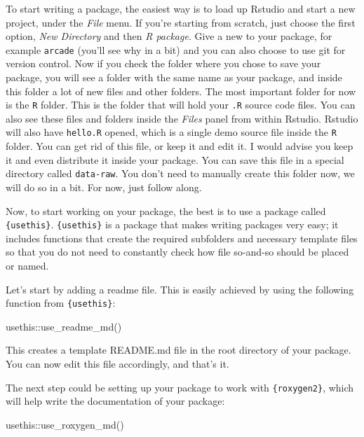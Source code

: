 \documentclass[
]{article}
\newenvironment{Shaded}{\begin{snugshade}}{\end{snugshade}}
\newcommand{\FunctionTok}[1]{\textcolor[rgb]{0.00,0.00,0.00}{#1}}
\newcommand{\NormalTok}[1]{#1}
\newcommand{\SpecialCharTok}[1]{\textcolor[rgb]{0.00,0.00,0.00}{#1}}
\begin{document}
To start writing a package, the easiest way is to load up Rstudio and start a new project, under the
\emph{File} menu. If you're starting from scratch, just choose the first option, \emph{New Directory} and then
\emph{R package}. Give a new to your package, for example \texttt{arcade} (you'll see why in a bit) and you can
also choose to use git for version control. Now if you check the folder where you chose to save
your package, you will see a folder with the same name as your package, and inside this folder a
lot of new files and other folders. The most important folder for now is the \texttt{R} folder. This is
the folder that will hold your \texttt{.R} source code files. You can also see these files and folders
inside the \emph{Files} panel from within Rstudio. Rstudio will also have \texttt{hello.R} opened, which is a
single demo source file inside the \texttt{R} folder. You can get rid of this file, or keep it and edit it.
I would advise you keep it and even distribute it inside your package. You can save this file
in a special directory called \texttt{data-raw}. You don't need to manually create this folder now, we will
do so in a bit. For now, just follow along.

Now, to start working on your package, the best is to use a package called \texttt{\{usethis\}}. \texttt{\{usethis\}}
is a package that makes writing packages very easy; it includes functions that create the required
subfolders and necessary template files so that you do not need to constantly check how file so-and-so
should be placed or named.

Let's start by adding a readme file. This is easily achieved by using the following function from
\texttt{\{usethis\}}:

\begin{Shaded}
\begin{Highlighting}[]
\NormalTok{usethis}\SpecialCharTok{::}\FunctionTok{use\_readme\_md}\NormalTok{()}
\end{Highlighting}
\end{Shaded}

This creates a template README.md file in the root directory of your package. You can now edit this
file accordingly, and that's it.

The next step could be setting up your package to work with \texttt{\{roxygen2\}}, which will help write
the documentation of your package:

\begin{Shaded}
\begin{Highlighting}[]
\NormalTok{usethis}\SpecialCharTok{::}\FunctionTok{use\_roxygen\_md}\NormalTok{()}
\end{Highlighting}
\end{Shaded}
\end{document}
